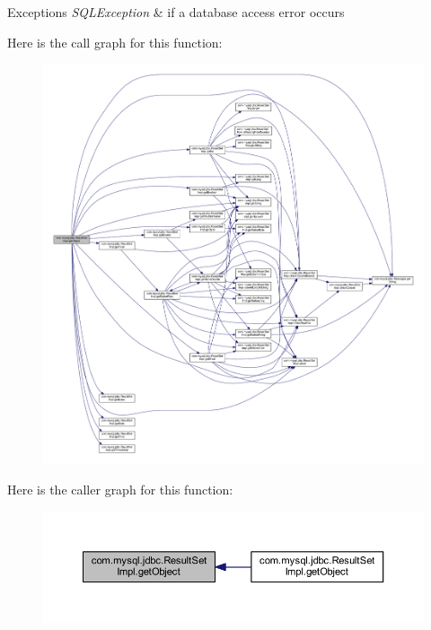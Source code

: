 \begin{DoxyExceptions}{Exceptions}
{\em S\+Q\+L\+Exception} & if a database access error occurs \\
\hline
\end{DoxyExceptions}
Here is the call graph for this function\+:
\nopagebreak
\begin{figure}[H]
\begin{center}
\leavevmode
\includegraphics[width=350pt]{classcom_1_1mysql_1_1jdbc_1_1_result_set_impl_ac61c9d2a780132e736f4acbdb25da396_cgraph}
\end{center}
\end{figure}
Here is the caller graph for this function\+:
\nopagebreak
\begin{figure}[H]
\begin{center}
\leavevmode
\includegraphics[width=350pt]{classcom_1_1mysql_1_1jdbc_1_1_result_set_impl_ac61c9d2a780132e736f4acbdb25da396_icgraph}
\end{center}
\end{figure}
\mbox{\label{classcom_1_1mysql_1_1jdbc_1_1_result_set_impl_aa6397841fe3f64b790d65903480a8e46}} 
